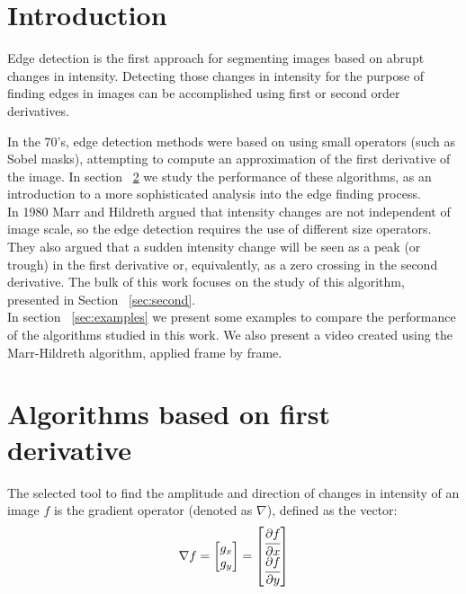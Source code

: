 \documentclass{ipol}
\numberwithin{equation}{section}
\numberwithin{table}{section}
\begin{document}
\section{Introduction}
\label{sec:intro}

Edge detection is the first approach for segmenting images
based on abrupt changes in intensity. Detecting those changes in intensity 
for the purpose of finding edges in images can be accomplished using first 
or second order derivatives. 

In the 70's, edge detection methods were based on using small operators 
(such as Sobel masks), attempting to compute an approximation of the
first derivative of the image. In section ~\ref{sec:first} we study the 
performance of these algorithms, as an introduction to a more sophisticated 
analysis into the edge finding process.\\

In 1980 Marr and Hildreth argued that intensity changes are not independent 
of image scale, so the edge detection requires the use of different size 
operators. They also argued that a sudden intensity change will be seen 
as a peak (or trough) in the first derivative or, equivalently, as a zero 
crossing in the second derivative. The bulk of this work focuses on the 
study of this algorithm, presented in Section ~\ref{sec:second}.\\

In section ~\ref{sec:examples} we present some examples to compare the 
performance of the algorithms studied in this work. We also present a 
video created using the Marr-Hildreth algorithm, applied frame by frame.\\

\section{Algorithms based on first derivative}
\label{sec:first}

The selected tool to find the amplitude and direction of changes in 
intensity of an image $f$ is the gradient operator (denoted as $\nabla$), defined 
as the vector:
\begin{equation}
	\nabla f = 
				\begin{bmatrix} 
					g_x \\ g_y
				\end{bmatrix}
	=				
				\begin{bmatrix} 
					\cfrac{\partial f}{\partial x} \\ \cfrac{\partial f}{\partial y} \\
				\end{bmatrix}
\end{equation}
\end{document}
